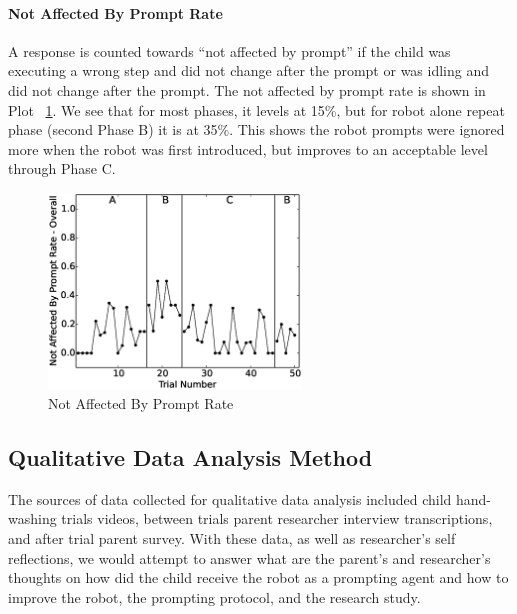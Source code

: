 \paragraph{Not Affected By Prompt Rate}
A response is counted towards ``not affected by prompt'' if the child was executing a wrong step and did not change after the prompt or was idling and did not change after the prompt.  The not affected by prompt rate is shown in Plot \ \ref{fig:99NotAffectedByPromptRate-Overall}.  We see that for most phases, it levels at 15\%, but for robot alone repeat phase (second Phase B) it is at 35\%.  This shows the robot prompts were ignored more when the robot was first introduced, but improves to an acceptable level through Phase C.
\begin{figure} [h]
	\centering
	\includegraphics[width=0.6\textwidth]{./img/data_analysis/99NotAffectedByPromptRate-Overall.eps}
	\caption{Not Affected By Prompt Rate}
	\label{fig:99NotAffectedByPromptRate-Overall}
\end{figure}















\subsection{Qualitative Data Analysis Method}
The sources of data collected for qualitative data analysis included child hand-washing trials videos, between trials parent researcher interview transcriptions, and after trial parent survey.  With these data, as well as researcher's self reflections, we would attempt to answer what are the parent's and researcher's thoughts on how did the child receive the robot as a prompting agent and how to improve the robot, the prompting protocol, and the research study.

